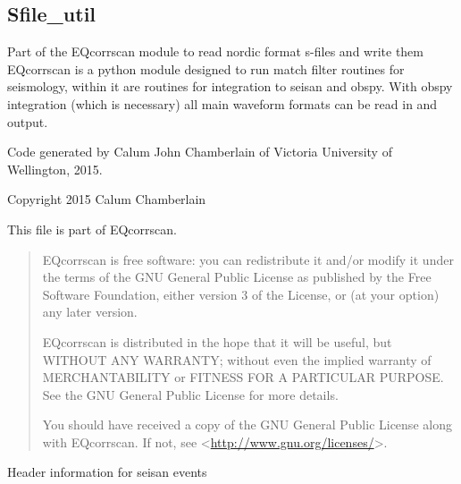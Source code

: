 \documentclass[a4paper,10pt,english]{sphinxmanual}
\begin{document}
\subsection{Sfile\_util}
\label{utils:module-Sfile_util}\label{utils:sfile-util}
Part of the EQcorrscan module to read nordic format s-files and write them
EQcorrscan is a python module designed to run match filter routines for
seismology, within it are routines for integration to seisan and obspy.
With obspy integration (which is necessary) all main waveform formats can be
read in and output.

Code generated by Calum John Chamberlain of Victoria University of Wellington,
2015.

Copyright 2015 Calum Chamberlain

This file is part of EQcorrscan.
\begin{quote}

EQcorrscan is free software: you can redistribute it and/or modify
it under the terms of the GNU General Public License as published by
the Free Software Foundation, either version 3 of the License, or
(at your option) any later version.

EQcorrscan is distributed in the hope that it will be useful,
but WITHOUT ANY WARRANTY; without even the implied warranty of
MERCHANTABILITY or FITNESS FOR A PARTICULAR PURPOSE.  See the
GNU General Public License for more details.

You should have received a copy of the GNU General Public License
along with EQcorrscan.  If not, see \textless{}\href{http://www.gnu.org/licenses/}{http://www.gnu.org/licenses/}\textgreater{}.
\end{quote}

\begin{fulllineitems}
\label{utils:Sfile_util.EVENTINFO}
Header information for seisan events

\end{fulllineitems}

\end{document}
